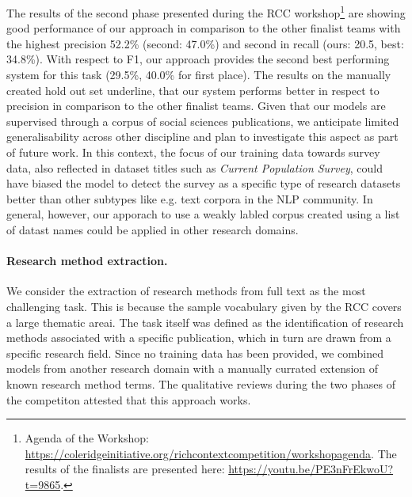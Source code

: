The results of the second phase presented during the RCC workshop\footnote{
    Agenda of the Workshop: 
    \url{https://coleridgeinitiative.org/richcontextcompetition/workshopagenda}.
    The results of the finalists are presented here: 
    \url{https://youtu.be/PE3nFrEkwoU?t=9865}.
}
are showing good performance of our approach in comparison to the other finalist teams with the highest precision 52.2\% (second: 47.0\%) and second in recall (ours: 20.5, best: 34.8\%).
With respect to F1, our approach provides the second best performing system for this task (29.5\%, 40.0\% for first place).
The results on the manually created hold out set underline, that our system performs better in respect to precision in comparison to the other finalist teams.
Given that our models are supervised through a corpus of social sciences publications, we anticipate limited generalisability across other discipline and plan to investigate this aspect as part of future work. In this context, the focus of our training data towards survey data, also reflected in dataset titles such as \textit{Current Population Survey}, could have biased the model to detect the survey as a specific type of research datasets better than other subtypes like e.g. text corpora in the NLP community.
In general, however, our apporach to use a weakly labled corpus created using a list of datast names could be applied in other research domains.
\begin{comment}
* limitations\
**    Performance is difficult to measure\\
**    Ground truth needed to have a good measure\\
**    During development a ground truth holdout set would have prevented the feeling to fish in troubled waters.\\
\end{comment}

\paragraph{Research method extraction.} %
We consider the extraction of research methods from full text as the most challenging task.
This is because the sample vocabulary given by the RCC covers a large thematic areai.
The task itself was defined as the identification of research methods associated with a specific publication, which in turn are drawn from a specific research field.
Since no training data has been provided, we combined models from another research domain with a manually currated extension of known research method terms.
The qualitative reviews during the two phases of the competiton attested that this approach works.

